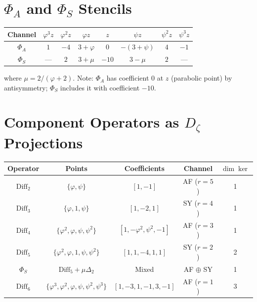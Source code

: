 \section{\texorpdfstring{$\Phi_A$}{φ_A} and \texorpdfstring{$\Phi_S$}{φ_S} Stencils}

\begin{center}
\begin{tabular}{|c|c|c|c|c|c|c|c|}
\hline
Channel & $\varphi^3 z$ & $\varphi^2 z$ & $\varphi z$ & $z$ & $\psi z$ & $\psi^2 z$ & $\psi^3 z$ \\
\hline
$\Phi_A$ & $1$ & $-4$ & $3+\varphi$ & $0$ & $-(3+\psi)$ & $4$ & $-1$ \\
$\Phi_S$ & --- & $2$ & $3+\mu$ & $-10$ & $3-\mu$ & $2$ & --- \\
\hline
\end{tabular}
\end{center}

where $\mu = 2/(\varphi + 2)$. Note: $\Phi_A$ has coefficient 0 at $z$ (parabolic point) by antisymmetry; $\Phi_S$ includes it with coefficient $-10$.

\section{Component Operators as \texorpdfstring{$D_\zeta$}{Dζ} Projections}

\begin{center}
\begin{tabular}{|c|c|c|c|c|}
\hline
Operator & Points & Coefficients & Channel & $\dim\ker$ \\
\hline
$\mathrm{Diff}_2$ & $\{\varphi, \psi\}$ & $[1, -1]$ & AF ($r=5$) & 1 \\
$\mathrm{Diff}_3$ & $\{\varphi, 1, \psi\}$ & $[1, -2, 1]$ & SY ($r=4$) & 1 \\
$\mathrm{Diff}_4$ & $\{\varphi^2, \varphi, \psi, \psi^2\}$ & $[1, -\varphi^2, \psi^2, -1]$ & AF ($r=3$) & 1 \\
$\mathrm{Diff}_5$ & $\{\varphi^2, \varphi, 1, \psi, \psi^2\}$ & $[1, 1, -4, 1, 1]$ & SY ($r=2$) & 2 \\
$\Phi_S$ & $\mathrm{Diff}_5 + \mu \Delta_2$ & Mixed & AF $\oplus$ SY & 1 \\
$\mathrm{Diff}_6$ & $\{\varphi^3, \varphi^2, \varphi, \psi, \psi^2, \psi^3\}$ & $[1, -3, 1, -1, 3, -1]$ & AF ($r=1$) & 3 \\
\hline
\end{tabular}
\end{center}

